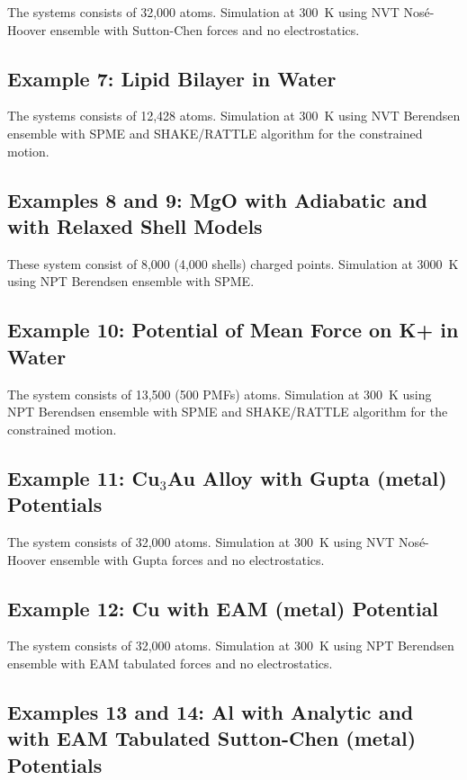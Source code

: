 The systems consists of 32,000 atoms.  Simulation at 300~K using NVT
Nos\'e-Hoover ensemble with Sutton-Chen forces and no electrostatics.

\subsection{Example 7: Lipid Bilayer in Water}

The systems consists of 12,428 atoms.  Simulation at 300~K using NVT
Berendsen ensemble with SPME and SHAKE/RATTLE algorithm for the constrained motion.

\subsection{Examples 8 and 9: MgO with Adiabatic and with Relaxed Shell Models}

These system consist of 8,000 (4,000 shells) charged points.  Simulation
at 3000~K using NPT Berendsen ensemble with SPME.

\subsection{Example 10: Potential of Mean Force on K+ in Water}

The system consists of 13,500 (500 PMFs) atoms.  Simulation at 300~K
using NPT Berendsen ensemble with SPME and SHAKE/RATTLE algorithm for
the constrained motion.

\subsection{Example 11: Cu$_{3}$Au Alloy with Gupta (metal) Potentials}

The system consists of 32,000 atoms.  Simulation at 300~K using NVT
Nos\'e-Hoover ensemble with Gupta forces and no electrostatics.

\subsection{Example 12: Cu with EAM (metal) Potential}

The system consists of 32,000 atoms.  Simulation at 300~K using NPT
Berendsen ensemble with EAM tabulated forces and no electrostatics.

\subsection{Examples 13 and 14: Al with Analytic and with EAM Tabulated Sutton-Chen (metal) Potentials}

